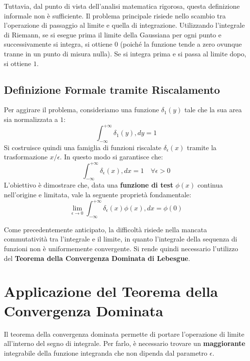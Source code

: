 Tuttavia, dal punto di vista dell'analisi matematica rigorosa, questa definizione informale non è sufficiente. Il problema principale risiede nello scambio tra l'operazione di passaggio al limite e quella di integrazione. Utilizzando l'integrale di Riemann, se si esegue prima il limite della Gaussiana per ogni punto e successivamente si integra, si ottiene $0$ (poiché la funzione tende a zero ovunque tranne in un punto di misura nulla). Se si integra prima e si passa al limite dopo, si ottiene $1$.

\subsection{Definizione Formale tramite Riscalamento}
Per aggirare il problema, consideriamo una funzione $\delta_1(y)$ tale che la sua area sia normalizzata a $1$:
\begin{equation}
\int_{-\infty}^{+\infty} \delta_1(y) , dy = 1
\end{equation}
Si costruisce quindi una famiglia di funzioni riscalate $\delta_\epsilon(x)$ tramite la trasformazione $x/\epsilon$. In questo modo si garantisce che:
\begin{equation}
\int_{-\infty}^{+\infty} \delta_\epsilon(x) , dx = 1 \quad \forall \epsilon > 0
\end{equation}
L'obiettivo è dimostrare che, data una \textbf{funzione di test} $\phi(x)$ continua nell'origine e limitata, vale la seguente proprietà fondamentale:
\begin{equation}
\lim_{\epsilon \to 0} \int_{-\infty}^{+\infty} \delta_\epsilon(x) \phi(x) , dx = \phi(0)
\end{equation}

Come precedentemente anticipato, la difficoltà risiede nella mancata commutatività tra l'integrale e il limite, in quanto l'integrale della sequenza di funzioni non è uniformemente convergente. Si rende quindi necessario l'utilizzo del \textbf{Teorema della Convergenza Dominata di Lebesgue}.

\section{Applicazione del Teorema della Convergenza Dominata}

Il teorema della convergenza dominata permette di portare l'operazione di limite all'interno del segno di integrale. Per farlo, è necessario trovare un \textbf{maggiorante} integrabile della funzione integranda che non dipenda dal parametro $\epsilon$.

